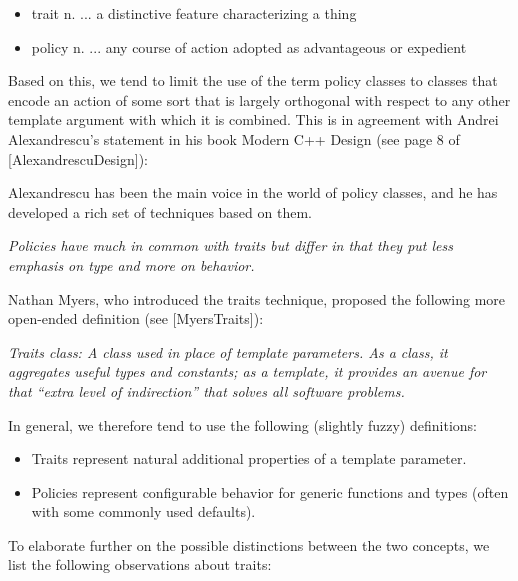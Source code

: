 \begin{itemize}
\item 
trait n. ... a distinctive feature characterizing a thing

\item 
policy n. ... any course of action adopted as advantageous or expedient
\end{itemize}

Based on this, we tend to limit the use of the term policy classes to classes that encode an action of some sort that is largely orthogonal with respect to any other template argument with which it is combined. This is in agreement with Andrei Alexandrescu’s statement in his book Modern C++ Design (see page 8 of [AlexandrescuDesign]):

\begin{tcolorbox}[colback=webgreen!5!white,colframe=webgreen!75!black]
\hspace*{0.75cm}Alexandrescu has been the main voice in the world of policy classes, and he has developed a rich set of techniques based on them.
\end{tcolorbox}

\textit{Policies have much in common with traits but differ in that they put less emphasis on type and more on behavior.}

Nathan Myers, who introduced the traits technique, proposed the following more open-ended definition (see [MyersTraits]):

\textit{Traits class: A class used in place of template parameters. As a class, it aggregates useful types and constants; as a template, it provides an avenue for that “extra level of indirection” that solves all software problems.}

In general, we therefore tend to use the following (slightly fuzzy) definitions:

\begin{itemize}
\item 
Traits represent natural additional properties of a template parameter.

\item 
Policies represent configurable behavior for generic functions and types (often with some commonly used defaults).
\end{itemize}

To elaborate further on the possible distinctions between the two concepts, we list the following observations about traits:

